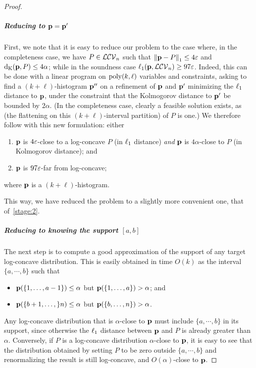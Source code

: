 \begin{proof}
\subparagraph{Reducing to $\D=\D^\prime$}
First, we note that it is easy to reduce our problem to the case where, in the completeness case, we have $P\in\classlogconcave$ such that $\normone{\D-P} \leq 4\eps$  and $\kolmogorov{\D}{P} \leq 4\alpha$; while in the soundness case $\lp[1](\D,\classlogconcave) \geq 97\eps$. Indeed, this can be done with a linear program on $\poly(k,\ell)$ variables and constraints, asking to find a $(k+\ell)$-histogram $\D^{\prime\prime}$ on a refinement of $\D$ and $\D^\prime$ minimizing the $\lp[1]$ distance to $\D$, under the constraint that the Kolmogorov distance to $\D^\prime$ be bounded by $2\alpha$. (In the completeness case, clearly a feasible solution exists, as (the flattening on this $(k+\ell)$-interval partition) of $P$ is one.) We therefore follow with this new formulation: either
  \begin{enumerate}[\sf(a)]
    \item $\D$ is $4\eps$-close to a log-concave $P$ (in $\lp[1]$ distance) \emph{and} $\D$ is $4\alpha$-close to $P$ (in Kolmogorov distance); and
    \item $\D$ is $97\eps$-far from log-concave;
  \end{enumerate} 
where $\D$ is a $(k+\ell)$-histogram.\medskip

\noindent This way, we have reduced the problem to a slightly more convenient one, that of~\cref{stage:2}.

\subparagraph{Reducing to knowing the support $[a,b]$}
The next step is to compute a good approximation of the support of any target log-concave distribution. This is easily obtained in time $O(k)$ as the interval $\{a,\cdots,b\}$ such that
\begin{itemize}
  \item $\D(\{1,\dots,a-1\}) \leq \alpha$ but $\D(\{1,\dots,a\}) > \alpha$; and
  \item $\D(\{b+1,\dots,\}n) \leq \alpha$ but $\D(\{b,\dots,n\}) > \alpha$.
\end{itemize} 
Any log-concave distribution that is $\alpha$-close to $\D$ must include  $\{a,\cdots,b\}$ in its support, since otherwise the $\lp[1]$ distance between $\D$ and $P$ is already greater than $\alpha$. Conversely, if $P$ is a log-concave distribution $\alpha$-close to $\D$, it is easy to see that the distribution obtained by setting $P$ to be zero outside $\{a,\cdots,b\}$ and renormalizing the result is still log-concave, and $O(\alpha)$-close to $\D$.


\end{proof}
